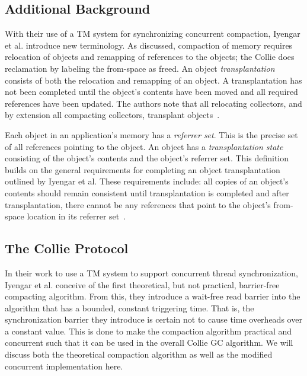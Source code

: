 \documentclass{sig-alternate}
\begin{document}
\subsection{Additional Background}
\label{sec:collieBackground}

With their use of a TM system for synchronizing concurrent compaction,
Iyengar et al. introduce new terminology. As discussed, compaction of
memory requires relocation of objects and remapping of references to
the objects; the Collie does reclamation by labeling the from-space as freed.
An object \emph{transplantation} consists of both the relocation and 
remapping of an object. A transplantation has not been completed until
the object's contents have been moved and all required references have been
updated. The authors note that all relocating collectors, and by extension all
compacting collectors, transplant objects~\cite{Iyengar:Collie}.

Each object in an application's memory has a \emph{referrer set}. This is the precise set 
of all references pointing to the object. 
An object has a \emph{transplantation state} consisting of the object's contents 
and the object's referrer set. This definition builds on the general requirements
for completing an object transplantation outlined by Iyengar et al. These
requirements include: all copies of an object's contents should remain consistent
until transplantation is completed and after transplantation, there cannot be any
references that point to the object's from-space location in its referrer set~\cite{Iyengar:Collie}.


\subsection{The Collie Protocol}
\label{sec:collieAlgorithm}

In their work to use a TM system to support concurrent thread 
synchronization, Iyengar et al. conceive of the first theoretical, 
but not practical, barrier-free compacting algorithm. From this,
they introduce a wait-free read barrier into the algorithm that has a bounded,
constant triggering time. That is, the synchronization barrier they introduce 
is certain not to cause time overheads over a constant value.
This is done to make the compaction algorithm practical and concurrent
such that it can be used in the overall Collie GC algorithm.
We will discuss both the theoretical compaction algorithm as well
as the modified concurrent implementation here.
\end{document}
